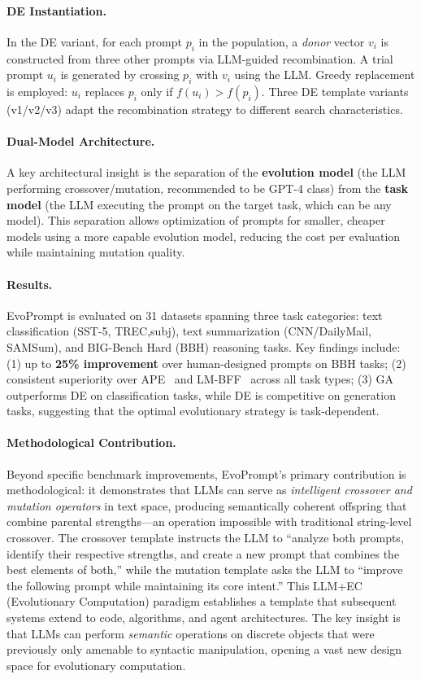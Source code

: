 \paragraph{DE Instantiation.}
In the DE variant, for each prompt $p_i$ in the population, a \emph{donor} vector $v_i$ is constructed from three other prompts via LLM-guided recombination. A trial prompt $u_i$ is generated by crossing $p_i$ with $v_i$ using the LLM. Greedy replacement is employed: $u_i$ replaces $p_i$ only if $f(u_i) > f(p_i)$. Three DE template variants (v1/v2/v3) adapt the recombination strategy to different search characteristics.

\paragraph{Dual-Model Architecture.}
A key architectural insight is the separation of the \textbf{evolution model} (the LLM performing crossover/mutation, recommended to be GPT-4 class) from the \textbf{task model} (the LLM executing the prompt on the target task, which can be any model). This separation allows optimization of prompts for smaller, cheaper models using a more capable evolution model, reducing the cost per evaluation while maintaining mutation quality.

\paragraph{Results.}
EvoPrompt is evaluated on 31 datasets spanning three task categories: text classification (SST-5, TREC,subj), text summarization (CNN/DailyMail, SAMSum), and BIG-Bench Hard (BBH) reasoning tasks. Key findings include: (1) up to \textbf{25\% improvement} over human-designed prompts on BBH tasks; (2) consistent superiority over APE~\citep{zhou2023ape} and LM-BFF~\citep{gao2021lm} across all task types; (3) GA outperforms DE on classification tasks, while DE is competitive on generation tasks, suggesting that the optimal evolutionary strategy is task-dependent.

\paragraph{Methodological Contribution.}
Beyond specific benchmark improvements, EvoPrompt's primary contribution is methodological: it demonstrates that LLMs can serve as \emph{intelligent crossover and mutation operators} in text space, producing semantically coherent offspring that combine parental strengths---an operation impossible with traditional string-level crossover. The crossover template instructs the LLM to ``analyze both prompts, identify their respective strengths, and create a new prompt that combines the best elements of both,'' while the mutation template asks the LLM to ``improve the following prompt while maintaining its core intent.'' This LLM+EC (Evolutionary Computation) paradigm establishes a template that subsequent systems extend to code, algorithms, and agent architectures. The key insight is that LLMs can perform \emph{semantic} operations on discrete objects that were previously only amenable to syntactic manipulation, opening a vast new design space for evolutionary computation.

